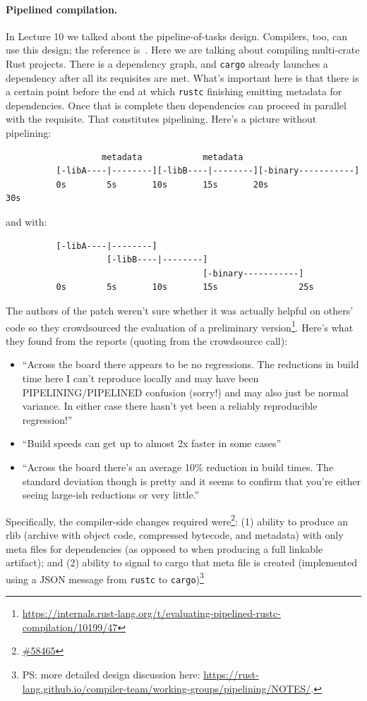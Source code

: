 \documentclass[a4paper]{report}
\begin{document}
\paragraph{Pipelined compilation.} In Lecture 10 we talked about the pipeline-of-tasks
design. Compilers, too, can use this design; the reference is~\cite{nethercote19b:_how_rust}.
Here we are talking about compiling multi-crate Rust projects. There is a dependency graph,
and \texttt{cargo} already launches a dependency after all its requisites are met.
What's important here is that there is a certain point before the end at which \texttt{rustc}
finishing emitting
metadata for dependencies. Once that is complete then dependencies can proceed in parallel with the
requisite. That constitutes pipelining. Here's a picture without pipelining:
\begin{verbatim}
                   metadata            metadata
          [-libA----|--------][-libB----|--------][-binary-----------]
          0s        5s       10s       15s       20s                30s
\end{verbatim}
and with:
\begin{verbatim}
          [-libA----|--------]
                    [-libB----|--------]
                                       [-binary-----------]
          0s        5s       10s       15s                25s
\end{verbatim}
The authors of the patch weren't sure whether it was actually helpful on others' code so they crowdsourced the evaluation
of a preliminary version\footnote{\url{https://internals.rust-lang.org/t/evaluating-pipelined-rustc-compilation/10199/47}}.
Here's what they found from the reports (quoting from the crowdsource call):
\begin{itemize}[noitemsep]
\item    ``Across the board there appears to be no regressions. The reductions in build time here I can't reproduce locally and may have been PIPELINING/PIPELINED confusion (sorry!) and may also just be normal variance. In either case there hasn't yet been a reliably reproducible regression!''
\item    ``Build speeds can get up to almost 2x faster in some cases''
\item    ``Across the board there's an average 10\% reduction in build times. The standard deviation though is pretty and it seems to confirm that you're either seeing large-ish reductions or very little.''
\end{itemize}
Specifically, the compiler-side changes required were\footnote{\href{https://github.com/rust-lang/rust/issues/58465}{\#58465}}: (1) ability to produce an rlib (archive with object code, compressed bytecode, and metadata) with only meta files for dependencies
(as opposed to when producing a full linkable artifact); and (2) ability to signal to cargo that meta file is created
(implemented using a JSON message from \texttt{rustc} to \texttt{cargo})\footnote{PS: more detailed design discussion here: \url{https://rust-lang.github.io/compiler-team/working-groups/pipelining/NOTES/}.}
\end{document}
